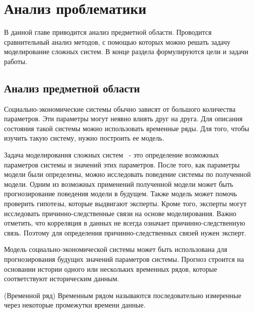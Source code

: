 

\chapter{Анализ проблематики }
\label{chapter1}

\begin{annotation}
	В данной главе приводится анализ предметной области.
	Проводится сравнительный анализ методов, с помощью которых
	можно решать задачу моделирование сложных систем.
	В конце раздела формулируются цели и задачи работы.
\end{annotation}


\section{Анализ предметной области}

Социально-экономические системы обычно зависят от большого количества параметров.
Эти параметры могут неявно влиять друг на друга. Для описания состояния такой системы
можно использовать временные ряды. Для того, чтобы изучить такую систему, нужно построить ее модель.

Задача моделирования сложных систем ~- это определение возможных параметров
системы и значений этих параметров. После того, как параметры модели были определены,
можно исследовать поведение системы по полученной модели. Одним из возможных
применений полученной модели может быть прогнозирование поведения модели в будущем.
Также модель может помочь проверить гипотезы, которые выдвигают эксперты.
Кроме того, эксперты могут исследовать причинно-следственные связи на основе моделирования.
Важно отметить, что корреляция в данных не всегда означает причинно-следственную связь.
Поэтому для определения причинно-следственных связей нужен эксперт.

Модель социально-экономической системы может быть использована
для прогнозирования будущих значений параметров системы. Прогноз строится на основании
истории одного или нескольких временных рядов, которые соответствуют историческим данным.

\begin{definition}
	(Временной ряд)
	Временным рядом называются последовательно измеренные через некоторые промежутки времени данные.
\end{definition}

